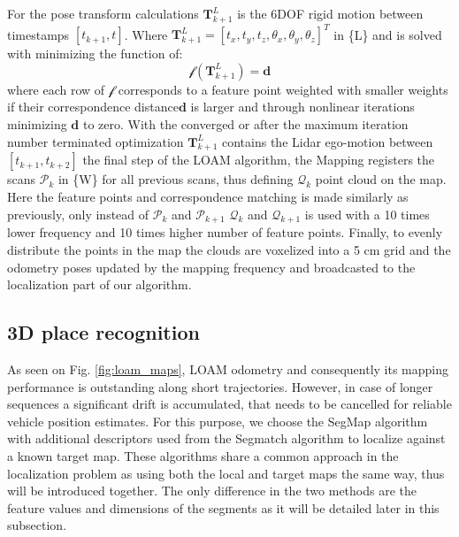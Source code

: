 \documentclass[letterpaper, 10 pt, conference]{ieeeconf}  %
\begin{document}
For the pose transform calculations $\mathbf{T}^L_{k+1}$ is the 6DOF rigid motion between timestamps $[t_{k+1}, t]$. Where $\mathbf{T}^L_{k+1}=[t_x, t_y, t_z, \theta_x, \theta_y, \theta_z]^T$ in \{L\} and is solved with minimizing the function of: 
\begin{equation}
  \bm{\mathscr{f}}(\mathbf{T}^L_{k+1})=\mathbf{d}
\end{equation}
where each row of $\bm{\mathscr{f}}$ corresponds to a feature point weighted with smaller weights if their correspondence distance$\mathbf{d}$ is larger and through nonlinear iterations minimizing $\mathbf{d}$ to zero. 
With the converged or after the maximum iteration number terminated optimization $\mathbf{T}^L_{k+1}$ contains the Lidar ego-motion between $[t_{k+1}, t_{k+2}]$ the final step of the LOAM algorithm, the Mapping registers the scans $\mathcal{P}_k$ in \{W\} for all previous scans, thus defining $\mathcal{Q}_k$ point cloud on the map. Here the feature points and correspondence matching is made similarly as previously, only instead of $\mathcal{P}_k$ and $\mathcal{P}_{k+1}$ $\mathcal{Q}_k$ and $\mathcal{Q}_{k+1}$ is used with a 10 times lower frequency and 10 times higher number of feature points. Finally, to evenly distribute the points in the map the clouds are voxelized into a 5 cm grid and the odometry poses updated by the mapping frequency and broadcasted to the localization part of our algorithm. 

\subsection{3D place recognition} \label{localization}
As seen on Fig. \ref{fig:loam_maps}, LOAM odometry and consequently its mapping performance is outstanding along short trajectories. However, in case of longer sequences a significant drift is accumulated, that needs to be cancelled for reliable vehicle position estimates. For this purpose, we choose the SegMap algorithm with additional descriptors used from the Segmatch algorithm \cite{segmatch} to localize against a known target map. These algorithms share a common approach in the localization problem as using both the local and target maps the same way, thus will be introduced together. The only difference in the two methods are the feature values and dimensions of the segments as it will be detailed later in this subsection. 
\end{document}
